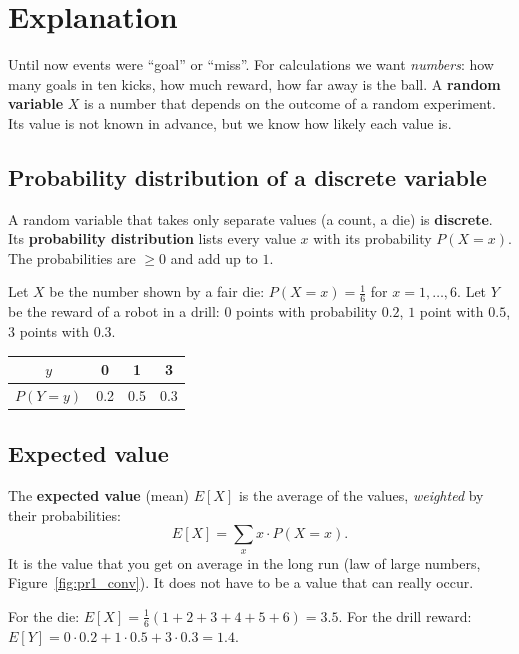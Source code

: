 \label{ch:rv}

\section*{Explanation}
Until now events were ``goal'' or ``miss''. For calculations we want \emph{numbers}: how many goals in ten kicks, how much reward, how far away is the ball. A \textbf{random variable} $X$ is a number that depends on the outcome of a random experiment. Its value is not known in advance, but we know how likely each value is.

\subsection*{Probability distribution of a discrete variable}
A random variable that takes only separate values (a count, a die) is \textbf{discrete}. Its \textbf{probability distribution} lists every value $x$ with its probability $P(X=x)$. The probabilities are $\ge0$ and add up to $1$.

\begin{example}
Let $X$ be the number shown by a fair die: $P(X=x)=\frac16$ for $x=1,\dots,6$. Let $Y$ be the reward of a robot in a drill: $0$ points with probability $0.2$, $1$ point with $0.5$, $3$ points with $0.3$.
\begin{center}
\renewcommand{\arraystretch}{1.15}
\begin{tabular}{c|ccc}
$y$ & 0 & 1 & 3\\ \hline
$P(Y=y)$ & 0.2 & 0.5 & 0.3
\end{tabular}
\end{center}
\end{example}

\subsection*{Expected value}
The \textbf{expected value} (mean) $E[X]$ is the average of the values, \emph{weighted} by their probabilities:
\[
E[X]=\sum_x x\cdot P(X=x).
\]
It is the value that you get on average in the long run (law of large numbers, Figure~\ref{fig:pr1_conv}). It does not have to be a value that can really occur.

For the die: $E[X]=\frac16(1+2+3+4+5+6)=3.5$. For the drill reward: $E[Y]=0\cdot0.2+1\cdot0.5+3\cdot0.3=1.4$.

\begin{center}
\label{fig:pr3_balance}
\end{center}

